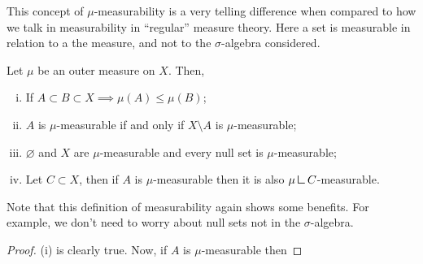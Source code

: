 This concept of $\mu$-measurability is a very telling difference when compared to how we talk
in measurability in ``regular'' measure theory. Here a set is measurable in relation
to a the measure, and not to the $\sigma$-algebra considered.

\begin{theorem}
	Let $\mu$ be an outer measure on $X$. Then,
	\begin{enumerate}[(i)]
		\item If $A\subset B \subset X \implies \mu(A) \leq \mu(B)$;
		\item $A$ is $\mu$-measurable if and only if $X\setminus A$ is $\mu$-measurable;
		\item $\varnothing$ and $X$ are $\mu$-measurable and every null set is $\mu$-measurable;
		\item Let $C \subset X$, then if $A$ is $\mu$-measurable then it is also $\mu \mres C$-measurable.
	\end{enumerate}
	Note that this definition of measurability again shows some benefits. For example,
	we don't need to worry about null sets not in the $\sigma$-algebra.
\end{theorem}
\begin{proof}
	(i) is clearly true. Now, if $A$ is $\mu$-measurable then

\end{proof}



